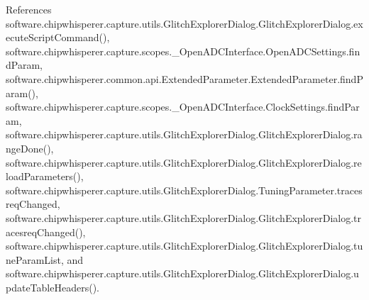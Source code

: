 References software.\+chipwhisperer.\+capture.\+utils.\+Glitch\+Explorer\+Dialog.\+Glitch\+Explorer\+Dialog.\+execute\+Script\+Command(), software.\+chipwhisperer.\+capture.\+scopes.\+\_\+\+Open\+A\+D\+C\+Interface.\+Open\+A\+D\+C\+Settings.\+find\+Param, software.\+chipwhisperer.\+common.\+api.\+Extended\+Parameter.\+Extended\+Parameter.\+find\+Param(), software.\+chipwhisperer.\+capture.\+scopes.\+\_\+\+Open\+A\+D\+C\+Interface.\+Clock\+Settings.\+find\+Param, software.\+chipwhisperer.\+capture.\+utils.\+Glitch\+Explorer\+Dialog.\+Glitch\+Explorer\+Dialog.\+range\+Done(), software.\+chipwhisperer.\+capture.\+utils.\+Glitch\+Explorer\+Dialog.\+Glitch\+Explorer\+Dialog.\+reload\+Parameters(), software.\+chipwhisperer.\+capture.\+utils.\+Glitch\+Explorer\+Dialog.\+Tuning\+Parameter.\+tracesreq\+Changed, software.\+chipwhisperer.\+capture.\+utils.\+Glitch\+Explorer\+Dialog.\+Glitch\+Explorer\+Dialog.\+tracesreq\+Changed(), software.\+chipwhisperer.\+capture.\+utils.\+Glitch\+Explorer\+Dialog.\+Glitch\+Explorer\+Dialog.\+tune\+Param\+List, and software.\+chipwhisperer.\+capture.\+utils.\+Glitch\+Explorer\+Dialog.\+Glitch\+Explorer\+Dialog.\+update\+Table\+Headers().


